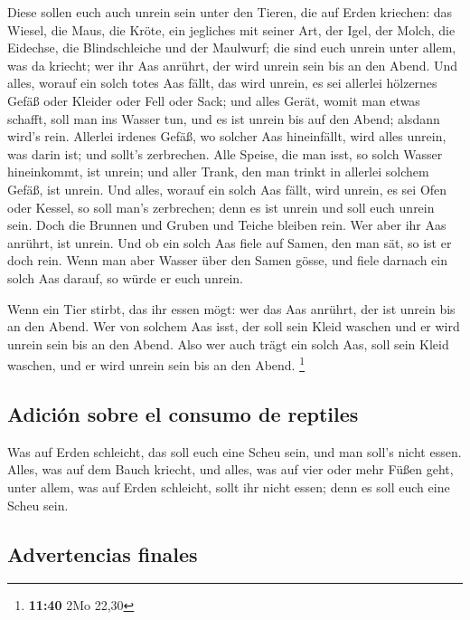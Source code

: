  Diese sollen euch auch unrein sein unter den Tieren, die
auf Erden kriechen: das Wiesel, die Maus, die Kröte, ein jegliches mit
seiner Art,  der Igel, der Molch, die Eidechse, die
Blindschleiche und der Maulwurf;  die sind euch unrein
unter allem, was da kriecht; wer ihr Aas anrührt, der wird unrein sein
bis an den Abend.  Und alles, worauf ein solch totes Aas
fällt, das wird unrein, es sei allerlei hölzernes Gefäß oder Kleider
oder Fell oder Sack; und alles Gerät, womit man etwas schafft, soll man
ins Wasser tun, und es ist unrein bis auf den Abend; alsdann wird's
rein.  Allerlei irdenes Gefäß, wo solcher Aas
hineinfällt, wird alles unrein, was darin ist; und sollt's zerbrechen.
 Alle Speise, die man isst, so solch Wasser hineinkommt,
ist unrein; und aller Trank, den man trinkt in allerlei solchem Gefäß,
ist unrein.  Und alles, worauf ein solch Aas fällt, wird
unrein, es sei Ofen oder Kessel, so soll man's zerbrechen; denn es ist
unrein und soll euch unrein sein.  Doch die Brunnen und
Gruben und Teiche bleiben rein. Wer aber ihr Aas anrührt, ist unrein.
 Und ob ein solch Aas fiele auf Samen, den man sät, so
ist er doch rein.  Wenn man aber Wasser über den Samen
gösse, und fiele darnach ein solch Aas darauf, so würde er euch unrein.

 Wenn ein Tier stirbt, das ihr essen mögt: wer das Aas
anrührt, der ist unrein bis an den Abend.  Wer von
solchem Aas isst, der soll sein Kleid waschen und er wird unrein sein
bis an den Abend. Also wer auch trägt ein solch Aas, soll sein Kleid
waschen, und er wird unrein sein bis an den Abend. \footnote{\textbf{11:40}
  2Mo 22,30}

\hypertarget{adiciuxf3n-sobre-el-consumo-de-reptiles}{%
\subsection{Adición sobre el consumo de
reptiles}\label{adiciuxf3n-sobre-el-consumo-de-reptiles}}

 Was auf Erden schleicht, das soll euch eine Scheu sein,
und man soll's nicht essen.  Alles, was auf dem Bauch
kriecht, und alles, was auf vier oder mehr Füßen geht, unter allem, was
auf Erden schleicht, sollt ihr nicht essen; denn es soll euch eine Scheu
sein.

\hypertarget{advertencias-finales}{%
\subsection{Advertencias finales}\label{advertencias-finales}}

